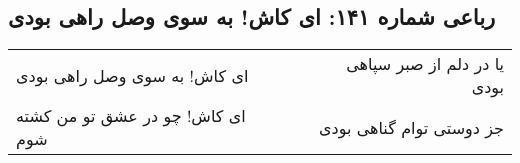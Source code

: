 \begin{center}
\section*{رباعی شماره ۱۴۱: ای کاش! به سوی وصل راهی بودی}
\label{sec:141}
\begin{longtable}{l p{0.5cm} r}
ای کاش! به سوی وصل راهی بودی
&&
یا در دلم از صبر سپاهی بودی
\\
ای کاش! چو در عشق تو من کشته شوم
&&
جز دوستی توام گناهی بودی
\\
\end{longtable}
\end{center}
